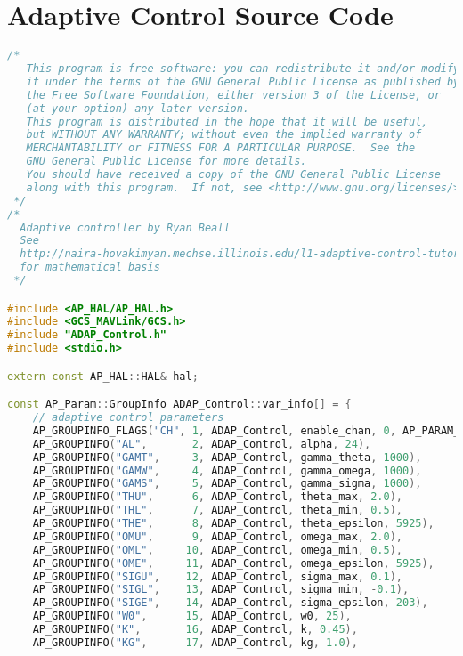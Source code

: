 \section{\Lone Adaptive Control Source Code}
\begin{lstlisting}[language=c++]
/*
   This program is free software: you can redistribute it and/or modify
   it under the terms of the GNU General Public License as published by
   the Free Software Foundation, either version 3 of the License, or
   (at your option) any later version.
   This program is distributed in the hope that it will be useful,
   but WITHOUT ANY WARRANTY; without even the implied warranty of
   MERCHANTABILITY or FITNESS FOR A PARTICULAR PURPOSE.  See the
   GNU General Public License for more details.
   You should have received a copy of the GNU General Public License
   along with this program.  If not, see <http://www.gnu.org/licenses/>.
 */
/*
  Adaptive controller by Ryan Beall
  See
  http://naira-hovakimyan.mechse.illinois.edu/l1-adaptive-control-tutorials/
  for mathematical basis
 */

#include <AP_HAL/AP_HAL.h>
#include <GCS_MAVLink/GCS.h>
#include "ADAP_Control.h"
#include <stdio.h>

extern const AP_HAL::HAL& hal;

const AP_Param::GroupInfo ADAP_Control::var_info[] = {
    // adaptive control parameters
    AP_GROUPINFO_FLAGS("CH", 1, ADAP_Control, enable_chan, 0, AP_PARAM_FLAG_ENABLE),
    AP_GROUPINFO("AL",       2, ADAP_Control, alpha, 24),
    AP_GROUPINFO("GAMT",     3, ADAP_Control, gamma_theta, 1000),
    AP_GROUPINFO("GAMW",     4, ADAP_Control, gamma_omega, 1000),
    AP_GROUPINFO("GAMS",     5, ADAP_Control, gamma_sigma, 1000),
    AP_GROUPINFO("THU",      6, ADAP_Control, theta_max, 2.0),
    AP_GROUPINFO("THL",      7, ADAP_Control, theta_min, 0.5),
    AP_GROUPINFO("THE",      8, ADAP_Control, theta_epsilon, 5925),
    AP_GROUPINFO("OMU",      9, ADAP_Control, omega_max, 2.0),
    AP_GROUPINFO("OML",     10, ADAP_Control, omega_min, 0.5),
    AP_GROUPINFO("OME",     11, ADAP_Control, omega_epsilon, 5925),
    AP_GROUPINFO("SIGU",    12, ADAP_Control, sigma_max, 0.1),
    AP_GROUPINFO("SIGL",    13, ADAP_Control, sigma_min, -0.1),
    AP_GROUPINFO("SIGE",    14, ADAP_Control, sigma_epsilon, 203),
    AP_GROUPINFO("W0",      15, ADAP_Control, w0, 25),
    AP_GROUPINFO("K",       16, ADAP_Control, k, 0.45),
    AP_GROUPINFO("KG",      17, ADAP_Control, kg, 1.0),
    

\end{lstlisting}

